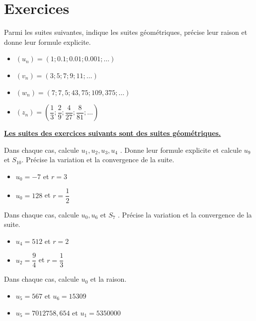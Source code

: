 \documentclass[a4paper,12pt]{report}
\begin{document}
\section{Exercices}
\label{sec:orgc44144d}
\begin{exercice}
Parmi les suites suivantes, indique les suites géométriques, précise leur raison et
donne leur formule explicite.

\par \setlength{\columnseprule}{0 pt}
          \begin{minipage}[t]{\linewidth}
          \begin{multicols}{2}
\begin{itemize}
\item \((u_n)=(1;0.1;0.01;0.001;\ldots)\)
\item \((v_n)=(3;5;7;9;11;\ldots)\)
\item \((w_n)=(7;7,5;43,75;109,375;\ldots)\)
\item \((z_n)=\left(\dfrac{1}{3};\dfrac{2}{9};\dfrac{4}{27};\dfrac{8}{81};\ldots\right)\)
\end{itemize}


\end{multicols}\end{minipage}
\end{exercice}
\uline{\textbf{Les suites des exercices suivants sont des suites géométriques.}}
\begin{exercice}
Dans chaque cas, calcule \(u_1,u_2,u_3,u_4\) . Donne leur formule
explicite et calcule \(u_9\) et \(S_{10}\).
Précise la variation et la convergence de la suite.
\begin{itemize}
\item \(u_0=-7\) et \(r=3\)
\item \(u_0=128\) et \(r=\dfrac{1}{2}\)
\end{itemize}
\end{exercice}

\begin{exercice}
Dans chaque cas, calcule \(u_0,u_6\) et \(S_7\) .
Précise la variation et la convergence de la suite.
\begin{itemize}
\item \(u_4=512\) et \(r=2\)
\item \(u_2=\dfrac{9}{4}\) et \(r=\dfrac{1}{3}\)
\end{itemize}
\end{exercice}

\begin{exercice}
Dans chaque cas, calcule \(u_0\) et la raison.

\begin{itemize}
\item \(u_5=567\) et \(u_6=15309\)
\item \(u_5=7012758,654\) et \(u_1=5350000\)
\end{itemize}
\end{exercice}
\end{document}
